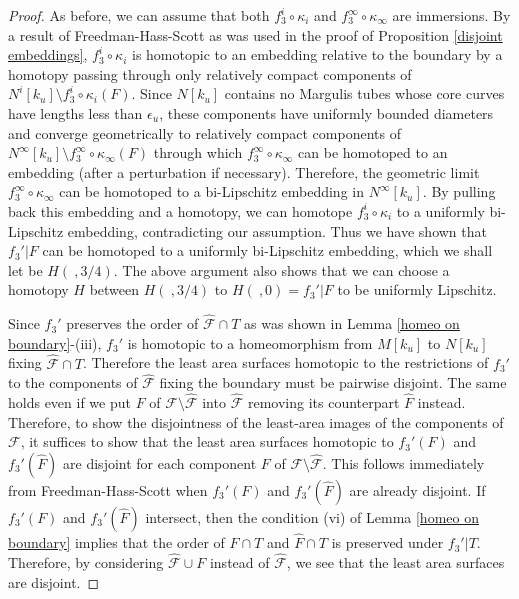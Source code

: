 \documentclass{amsart}
\theoremstyle{definition}
\numberwithin{figure}{section}
\numberwithin{equation}{section}
\begin{document}
\begin{proof}
As before, we can assume that both $f^i_3 \circ \kappa_i$ and $f^\infty_3 \circ \kappa_\infty$ are immersions.
By a result of Freedman-Hass-Scott as was used in the proof of Proposition \ref{disjoint embeddings}, $f^i_3 \circ \kappa_i$ is homotopic to an embedding relative to the boundary by a homotopy passing through only relatively compact components of $N^i[k_u] \setminus f_3^i \circ \kappa_i(F)$.
Since $N[k_u]$ contains no Margulis tubes whose core curves have lengths less than $\epsilon_u$, these components have uniformly bounded diameters and   converge geometrically to relatively compact components of $N^\infty[k_u] \setminus f_3^\infty \circ \kappa_\infty(F)$ through which $f_3^\infty \circ \kappa_\infty$ can be homotoped to an embedding (after a perturbation if necessary).
Therefore, the geometric limit $f_3^\infty \circ \kappa_\infty$ can be homotoped to a bi-Lipschitz embedding in $N^\infty[k_u]$.
By pulling back this embedding and a homotopy, we can homotope $f_3^i \circ \kappa_i$ to a uniformly bi-Lipschitz embedding, contradicting our assumption.
Thus we have shown that $f_3'|F$ can be homotoped to a uniformly bi-Lipschitz embedding, which we shall let be $H(\ ,3/4)$.
The above argument also shows that we can choose a homotopy $H$ between $H(\ , 3/4)$ to $H(\ , 0)=f_3'|F$ to be uniformly Lipschitz.

Since $f_3'$ preserves the order of $\hat{\mathcal F} \cap T$ as was shown in Lemma \ref{homeo on boundary}-(iii), $f_3'$ is homotopic to a homeomorphism from $M[k_u]$ to $N[k_u]$ fixing $\hat{\mathcal F} \cap T$. 
Therefore  the least area surfaces homotopic to the restrictions of $f_3'$ to  the components of $\hat{\mathcal F}$ fixing the boundary must be pairwise disjoint.
The same holds even if we put  $F$ of $\mathcal{F} \setminus \hat{\mathcal F}$ into $\hat{\mathcal F}$ removing its counterpart  $\hat F$ instead.
Therefore, to show the disjointness of  the least-area images of the components of $\mathcal F$, it suffices to show that the least area surfaces homotopic to $f_3'(F)$ and $f_3'(\hat F)$ are disjoint for each component $F$ of $\mathcal F \setminus \hat{\mathcal F}$.
This follows immediately from Freedman-Hass-Scott when $f_3'(F)$ and $f_3'(\hat F)$ are already disjoint.
If $f_3'(F)$ and $f_3'(\hat F)$ intersect, then the condition (vi) of Lemma \ref{homeo on boundary} implies that the order of $F \cap T$ and $\hat F \cap T$ is preserved under $f_3'|T$.
Therefore, by considering $\hat{\mathcal F} \cup F$ instead of $\hat{\mathcal F}$, we see that the least area surfaces are disjoint.



\end{proof}
\end{document}
